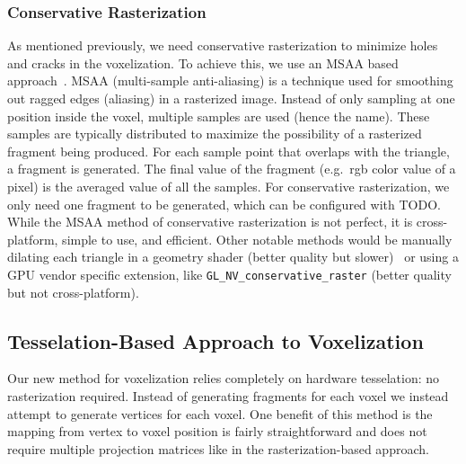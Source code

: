 
\subsubsection{Conservative Rasterization}
As mentioned previously, we need conservative rasterization to minimize holes and cracks in the voxelization. To achieve this, we use an MSAA based approach~\cite{takeshige2015basics}. MSAA (multi-sample anti-aliasing) is a technique used for smoothing out ragged edges (aliasing) in a rasterized image. Instead of only sampling at one position inside the voxel, multiple samples are used (hence the name). These samples are typically distributed to maximize the possibility of a rasterized fragment being produced. For each sample point that overlaps with the triangle, a fragment is generated. The final value of the fragment (e.g.\ rgb color value of a pixel) is the averaged value of all the samples. For conservative rasterization, we only need one fragment to be generated, which can be configured with TODO. While the MSAA method of conservative rasterization is not perfect, it is cross-platform, simple to use, and efficient. Other notable methods would be manually dilating each triangle in a geometry shader (better quality but slower)~\cite{akenine2005conservative} or using a GPU vendor specific extension, like \verb#GL_NV_conservative_raster# (better quality but not cross-platform).




\subsection{Tesselation-Based Approach to Voxelization}
Our new method for voxelization relies completely on hardware tesselation: no rasterization required. Instead of generating fragments for each voxel we instead attempt to generate vertices for each voxel. One benefit of this method is the mapping from vertex to voxel position is fairly straightforward and does not require multiple projection matrices like in the rasterization-based approach.

